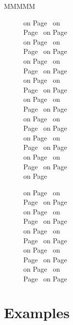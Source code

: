 \begin{figure}
\begin{figure}
\begin{figure}
\begin{figure}
\begin{DL}{MMMMM}
\begin{figure}
on Page~\pageref{RZEND}
on Page~\pageref{RZFILE}
on Page~\pageref{RZFREE}
on Page~\pageref{RZFRFZ}
on Page~\pageref{RZIN}
on Page~\pageref{RZINPA}
on Page~\pageref{RZKEYD}
on Page~\pageref{RZKEYS}
on Page~\pageref{RZLDIR}
on Page~\pageref{RZLOCK}
on Page~\pageref{RZLOGL}
on Page~\pageref{RZMAKE}
on Page~\pageref{RZMDIR}
on Page~\pageref{RZNDIR}
on Page~\pageref{RZOUT}
on Page~\pageref{RZPASS}
on Page~\pageref{RZPURG}
on Page~\pageref{RZQUOT}
on Page~\pageref{RZRDIR}
on Page~\pageref{RZRENK}
on Page~\pageref{RZSAVE}
on Page~\pageref{RZSTAT}
on Page~\pageref{RZTOFZ}
on Page~\pageref{RZVIN}
on Page~\pageref{RZVOUT}
\end{figure}
\begin{figure}
on Page~\pageref{ZEND}
on Page~\pageref{ZFATAL}
on Page~\pageref{ZFATAM}
on Page~\pageref{ZPHASE}
on Page~\pageref{ZPOSTM}
on Page~\pageref{ZPRESS}
on Page~\pageref{ZSHUNT}
on Page~\pageref{ZSORT}
on Page~\pageref{ZSORTH}
on Page~\pageref{ZSORTI}
on Page~\pageref{ZSORV}
on Page~\pageref{ZSORVH}
on Page~\pageref{ZSORVI}
on Page~\pageref{ZTELL}
on Page~\pageref{ZTOPSY}
\end{figure}
\chapter{Examples}

\end{DL}
\end{figure}
\end{figure}
\end{figure}
\end{figure}
